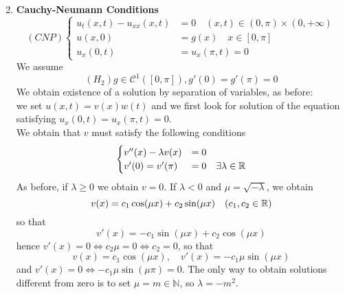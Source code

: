 \begin{enumerate}
\begin{itemize}
\begin{equation*}
        \end{equation*}
    \end{itemize}
    \item \textbf{Cauchy-Neumann Conditions}
        \begin{equation*}
        (CNP)
            \begin{cases}
                u_t(x,t) - u_{xx}(x,t) & = 0 \quad (x,t) \in (0,\pi) \times (0,+\infty) \\
                u(x,0) &= g(x) \quad x \in [0,\pi]\\
                u_x(0,t)&= u_x(\pi,t) = 0 
            \end{cases}
        \end{equation*}
        We assume 
        \begin{equation*}
            (H_2) g \in \mathcal{C}^1([0,\pi]), g'(0) = g'(\pi) = 0
        \end{equation*}
        We obtain existence of a solution by separation of variables, as before:\\
        we set $u(x,t) = v(x) w(t)$ and we first look for solution of the equation satisfying $u_x(0,t) = u_x(\pi,t) = 0$. \\
        We obtain that $v$ must satisfy the following conditions 
        \begin{equation*}
            \begin{cases}
                v''(x)-\lambda v(x) &= 0\\
                v'(0) = v'(\pi) &= 0 \quad \exists \lambda \in \mathbb{R}
            \end{cases}
        \end{equation*}
        As before, if $\lambda \geq 0$ we obtain $v=0$. If $\lambda < 0$ and $\mu = \sqrt{- \lambda}$, we obtain 
        \begin{equation*}
            v(x)=c_1 \cos(\mu x) + c_2 \sin (\mu x) \quad (c_1,c_2 \in \mathbb{R})
        \end{equation*}
        so that 
        \begin{equation*}
            v'(x)=-c_1 \sin(\mu x) +c_2 \cos (\mu x)
        \end{equation*}
        hence $v'(x)=0 \iff c_2 \mu = 0 \iff c_2 = 0$, so that 
        \begin{equation*}
            v(x)=c_1 \cos (\mu x), \quad v'(x) = -c_1 \mu \sin (\mu x)
        \end{equation*}
        and $v'(x) = 0 \iff -c_1 \mu \sin(\mu \pi) = 0$. The only way to obtain solutions different from zero is to set $\mu = m \in \mathbb{N}$, so $\lambda = - m^2$.\\

\end{enumerate}
